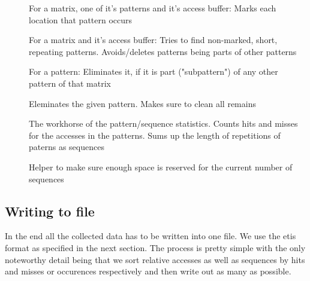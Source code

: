 \begin{description}
\item[] For a matrix, one of it's patterns and it's access buffer: Marks each location that pattern occurs
\item[] For a matrix and it's access buffer: Tries to find non-marked, short, repeating patterns. Avoids/deletes patterns being parts of other patterns
\item[] For a pattern: Eliminates it, if it is part ("subpattern") of any other pattern of that matrix
\item[] Eleminates the given pattern. Makes sure to clean all remains
\item[] The workhorse of the pattern/sequence statistics. Counts hits and misses for the accesses in the patterns. Sums up the length of repetitions of paterns as sequences
\item[] Helper to make sure enough space is reserved for the current number of sequences

\end{description}

\subsection{Writing to file}

In the end all the collected data has to be written into one file. We use the etis format as specified in the next section. The process is pretty simple with the only noteworthy detail being that we sort relative accesses
as well as sequences by hits and misses or occurences respectively and then write out as many as possible.

